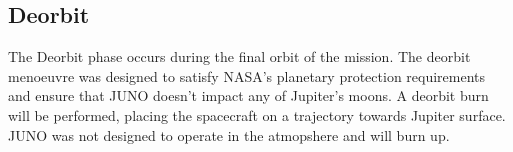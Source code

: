  \subsection{Deorbit}
The Deorbit phase occurs during the final orbit of the mission. The deorbit menoeuvre was designed to satisfy NASA's planetary protection requirements and 
ensure that JUNO doesn't impact any of Jupiter's moons. A deorbit burn will be performed, placing the spacecraft on a trajectory towards Jupiter surface. 
JUNO was not designed to operate in the atmopshere and will burn up.





